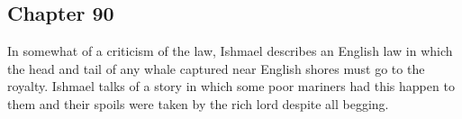 \subsection{Chapter 90}

In somewhat of a criticism of the law, Ishmael describes an English law in
which the head and tail of any whale captured near English shores must go to
the royalty. Ishmael talks of a story in which some poor mariners had this
happen to them and their spoils were taken by the rich lord despite all
begging.
